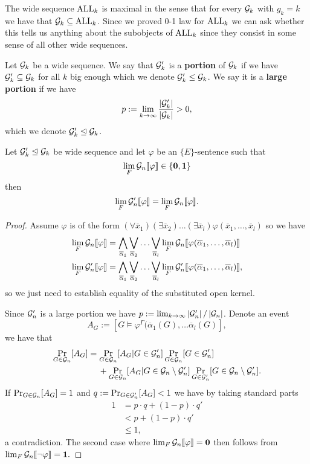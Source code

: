 The wide sequence $\text{ALL}_k$ is maximal in the sense that for every $\mathcal{G}_k$ with $g_k=k$ we have that $\mathcal{G}_{k}\subseteq \text{ALL}_{k}$. Since we proved 0-1 law for $\text{ALL}_k$ we can ask whether this tells us anything about the subobjects of $\text{ALL}_k$ since they consist in some sense of all other wide sequences.

\begin{defi}
Let $\mathcal{G}_k$ be a wide sequence. We say that $\mathcal{G}_k'$ is a \textbf{portion} of $\mathcal{G}_k$ if we have $\mathcal{G}_k'\subseteq \mathcal{G}_k$ for all $k$ big enough which we denote $\mathcal{G}_k'\leq \mathcal{G}_k$. We say it is a \textbf{large portion} if we have
\[p:=\lim_{k\to\infty}\frac{\left|{\mathcal{G}_k'}\right|}{\left|{\mathcal{G}_k}\right|}>0,\]
which we denote $\mathcal{G}_k' \trianglelefteq \mathcal{G}_k$.
\end{defi}

\begin{lemm}\label{lemmhere}
Let $\mathcal{G}_k'\trianglelefteq \mathcal{G}_k$ be wide sequence and let $\varphi$ be an $\{E\}$-sentence such that
\[\lim_{F}\mathcal{G}_n\llbracket\varphi\rrbracket\in\{\textbf{0},\textbf{1}\}\]
then
\[\lim_{F}\mathcal{G}_n'\llbracket\varphi\rrbracket = \lim_{F}\mathcal{G}_n\llbracket\varphi\rrbracket.\]
\end{lemm}
\begin{proof} 
Assume $\varphi$ is of the form $(\forall \overline x_1)(\exists \overline x_2)\dots (\exists \overline x_l)\varphi(\overline x_1,\dots,\overline x_l)$ so we have
\begin{align*}
\lim_{F}\G_n\bbl\varphi\bbr &= \Land_{\overline \alpha_1}\Lor_{\overline \alpha_2}\dots \Lor_{\overline \alpha_l}\lim_{F}\G_n\bbl\varphi(\overline \alpha_1,\dots,{\overline \alpha_l})\bbr\\
\lim_{F}\G_n'\bbl\varphi\bbr &= \Land_{\overline \alpha_1}\Lor_{\overline \alpha_2}\dots \Lor_{\overline \alpha_l}\lim_{F}\G_n'\bbl\varphi(\overline \alpha_1,\dots,{\overline \alpha_l})\bbr,
\end{align*}
so we just need to establish equality of the substituted open kernel.

Since $\mathcal{G}_n'$ is a large portion we have $p:=\lim_{k\to\infty}\left|{\mathcal{G}_n'}\right|/\left|{\mathcal{G}_n}\right|$. Denote an event
\[A_G:=[G\models \varphi^{\Gamma}(\overline\alpha_1(G),\dots\overline \alpha_l(G)],\]
we have that 
\begin{align}
\Pr_{G\in\mathcal{G}_n}[A_G]&=\Pr_{G\in \mathcal{G}_n}[A_G|G\in\mathcal{G}_n']\Pr_{G\in\mathcal{G}_n}[G\in\mathcal{G}_n']\\
&\phantom{\:=\:}+\Pr_{G\in\mathcal{G}_n}[A_G|G\in\mathcal{G}_n\setminus\mathcal{G}_n']\Pr_{G\in\mathcal{G}_n'}[G\in\mathcal{G}_n \setminus \mathcal{G}_n'].
\end{align}
If $\Pr_{G\in\mathcal{G}_n}[A_G]=1$ and $q:=\Pr_{G\in\mathcal{G}_n'}[A_G]<1$ we have by taking standard parts
\begin{align}
1&=p\cdot q + (1-p)\cdot q'\\
&< p + (1-p)\cdot q'\\
&\leq1,
\end{align}
a contradiction. The second case where $\lim_F\mathcal{G}_n\llbracket\varphi\rrbracket=\textbf{0}$ then follows from $\lim_F\mathcal{G}_n\llbracket\lnot\varphi\rrbracket=\textbf{1}.$ 
\end{proof}

